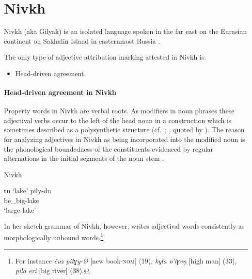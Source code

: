 \section{Nivkh}
Nivkh (aka Gilyak) is an isolated language spoken in the far east on the Eurasian continent on Sakhalin Island in easternmost Russia \citep[222–223]{salminen2007}.

The only type of adjective attribution marking attested in Nivkh is:
\begin{itemize}
\item Head\hyp{}driven agreement.
\end{itemize}

\paragraph*{Head\hyp{}driven agreement in Nivkh}
Property words in Nivkh are verbal roots. As modifiers in noun phrases these adjectival verbs occur to the left of the head noun in a construction which is sometimes described as a polysynthetic structure (cf.~\citealt[16]{gruzdeva1998}; \citealt[80]{jakobson1971}, quoted by \citealt[138]{rijkhoff2002}). The reason for analyzing adjectives in Nivkh as being incorporated into the modified noun is the phonological boundedness of the constituents evidenced by regular alternations in the initial segments of the noun stem \cite[16]{gruzdeva1998}.
\begin{exe}
\ex \rm{Nivkh \citep[16]{gruzdeva1998}}
\begin{xlist}
\ex tu ‘lake’
\ex 
\gll	pily-du\\
	be\_big-lake\\
\glt	‘large lake’
\end{xlist}
\end{exe}
In her sketch grammar of Nivkh, however, \cite{gruzdeva1998} writes adjectival words consistently as morphologically unbound words.\footnote{For instance \textit{čuz pitɣy-Ø} [new book-\textsc{nom}] (19), \textit{kyla n'iɣvn̦} [high man] (33), \textit{pila eri} [big river] (38).}

